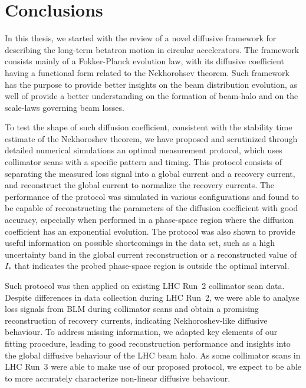 \chapter*{Conclusions}

In this thesis, we started with the review of a novel diffusive framework for describing the long-term betatron motion in circular accelerators. The framework consists mainly of a Fokker-Planck evolution law, with its diffusive coefficient having a functional form related to the Nekhorohsev theorem. Such framework has the purpose to provide better insights on the beam distribution evolution, as well of provide a better understanding on the formation of beam-halo and on the scale-laws governing beam losses.

To test the shape of such diffusion coefficient, consistent with the stability time estimate of the Nekhoroshev theorem, we have proposed and scrutinized through detailed numerical simulations an optimal measurement protocol, which uses collimator scans with a specific pattern and timing. This protocol consists of separating the measured loss signal into a global current and a recovery current, and reconstruct the global current to normalize the recovery currents. The performance of the protocol was simulated in various configurations and found to be capable of reconstructing the parameters of the diffusion coefficient with good accuracy, especially when performed in a phase-space region where the diffusion coefficient has an exponential evolution. The protocol was also shown to provide useful information on possible shortcomings in the data set, such as a high uncertainty band in the global current reconstruction or a reconstructed value of $I_\ast$ that indicates the probed phase-space region is outside the optimal interval.

Such protocol was then applied on existing LHC Run~2 collimator scan data. Despite differences in data collection during LHC Run~2, we were able to analyse loss signals from BLM during collimator scans and obtain a promising reconstruction of recovery currents, indicating Nekhoroshev-like diffusive behaviour. To address missing information, we adapted key elements of our fitting procedure, leading to good reconstruction performance and insights into the global diffusive behaviour of the LHC beam halo. As some collimator scans in LHC Run~3 were able to make use of our proposed protocol, we expect to be able to more accurately characterize non-linear diffusive behaviour.


